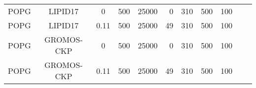 \documentclass[aps,prl,superscriptaddress,twocolumn]{revtex4}
\begin{document}
\begin{table*}[htb]
\begin{minipage}[t]{\textwidth}
\begin{tabular}{l c c r r r r r r c c}
      \hline
      POPG             & LIPID17 \cite{??}         & 0              & 500 & 25000 & 0   &  310  & 500 & 100 & \cite{POPGlipid17} \\
      POPG             & LIPID17 \cite{??}         & 0.11           & 500 & 25000 & 49  &  310  & 500 & 100 & \cite{POPGlipid17150mMNaCl} \\
      \hline
      POPG             & GROMOS-CKP \cite{??}         & 0              & 500 & 25000 & 0  &  310  & 500 & 100 & \cite{POPGgromosCKP} \\
      POPG             & GROMOS-CKP \cite{??}         & 0.11           & 500 & 25000 & 49 &  310  & 500 & 100 & \cite{POPGgromosCKP150mMNaCl} \\
    \end{tabular}
  \end{minipage}
\end{table*}
\end{document}

